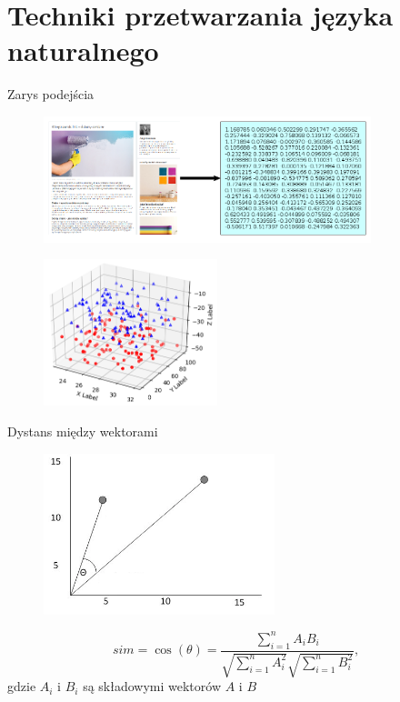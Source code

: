 \documentclass{beamer}
\begin{document}
	\section{Techniki przetwarzania języka naturalnego}
	\begin{frame}{Zarys podejścia}
		\begin{figure}
			\centering
			\includegraphics[width=0.85\textwidth]{img/approach_outline.png}
		\end{figure}
		\pause
		\begin{figure}
			\centering
			\includegraphics[width=0.45\textwidth]{img/scatter3d_demo.png}
		\end{figure}
	\end{frame}
	\begin{frame}{Dystans między wektorami}
		\begin{figure}
			\centering
			\includegraphics[width=0.6\textwidth]{img/cos.png}
		\end{figure}
		\pause %
		\begin{equation}
		\label{eq:cos}
		sim=\cos(\theta )={\frac {\sum \limits _{i=1}^{n}{A_{i}B_{i}}}{{\sqrt {\sum \limits _{i=1}^{n}{A_{i}^{2}}}}{\sqrt {\sum \limits _{i=1}^{n}{B_{i}^{2}}}}}},
		\end{equation}
		gdzie $A_i$ i $B_i$ są składowymi wektorów $A$ i $B$
	\end{frame}
\end{document}
